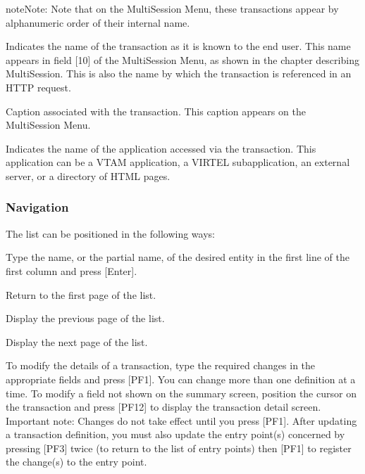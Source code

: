 \documentclass[letterpaper,10pt,english]{sphinxmanual}
\begin{document}
\begin{sphinxadmonition}{note}{Note:}
\sphinxAtStartPar
Note that on the Multi\sphinxhyphen{}Session Menu, these transactions appear by alphanumeric order of their internal name.
\end{sphinxadmonition}
\begin{description}
\sphinxAtStartPar
Indicates the name of the transaction as it is known to the end user. This name appears in field {[}10{]} of the Multi\sphinxhyphen{}Session Menu, as shown in the chapter describing Multi\sphinxhyphen{}Session. This is also the name by which the transaction is referenced in an HTTP request.

\sphinxAtStartPar
Caption associated with the transaction. This caption appears on the Multi\sphinxhyphen{}Session Menu.

\sphinxAtStartPar
Indicates the name of the application accessed via the transaction. This application can be a VTAM application, a VIRTEL sub\sphinxhyphen{}application, an external server, or a directory of HTML pages.

\end{description}


\subsubsection{Navigation}
\label{\detokenize{connectivity_guide:id65}}
\sphinxAtStartPar
The list can be positioned in the following ways:
\begin{description}
\sphinxAtStartPar
Type the name, or the partial name, of the desired entity in the first line of the first column and press {[}Enter{]}.

\sphinxlineitem{{[}PF6{]}}
\sphinxAtStartPar
Return to the first page of the list.

\sphinxlineitem{{[}PF7{]}}
\sphinxAtStartPar
Display the previous page of the list.

\sphinxlineitem{{[}PF8{]}}
\sphinxAtStartPar
Display the next page of the list.

\end{description}

\sphinxAtStartPar
{} \sphinxhyphen{} To modify the details of a transaction, type the required changes in the appropriate fields and press {[}PF1{]}. You can change more than one definition at a time. To modify a field not shown on the summary screen, position the cursor on the transaction and press {[}PF12{]} to display the transaction detail screen. Important note: Changes do not take effect until you press {[}PF1{]}. After updating a transaction definition, you must also update the entry point(s) concerned by pressing {[}PF3{]} twice (to return to the list of entry points) then {[}PF1{]} to register the change(s) to the entry point.
\end{document}

